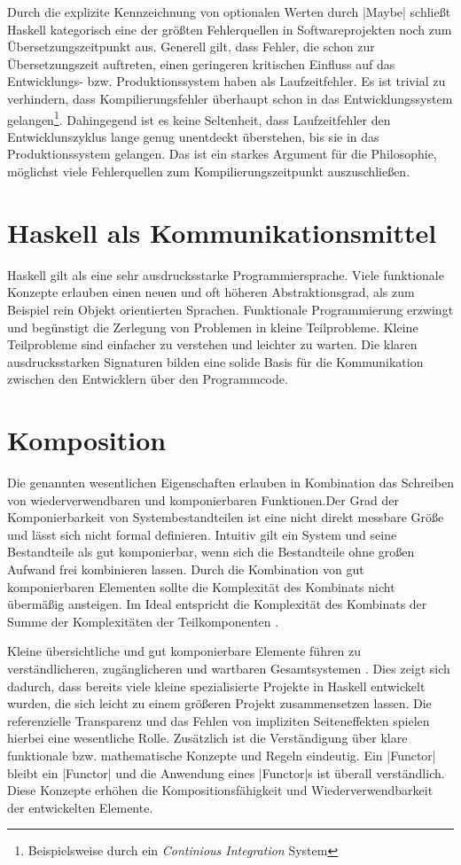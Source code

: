 Durch die explizite Kennzeichnung von optionalen Werten durch |Maybe| schließt Haskell kategorisch eine der größten Fehlerquellen in Softwareprojekten noch zum Übersetzungszeitpunkt aus. Generell gilt, dass Fehler, die schon zur Übersetzungszeit auftreten, einen geringeren kritischen Einfluss auf das Entwicklungs- bzw. Produktionssystem haben als Laufzeitfehler. Es ist trivial zu verhindern, dass Kompilierungsfehler überhaupt schon in das Entwicklungssystem gelangen\footnote{Beispielsweise durch ein \textit{Continious Integration} System}. Dahingegend ist es keine Seltenheit, dass Laufzeitfehler den Entwicklunszyklus lange genug unentdeckt überstehen, bis sie in das Produktionssystem gelangen. Das ist ein starkes Argument für die Philosophie, möglichst viele Fehlerquellen zum Kompilierungszeitpunkt auszuschließen.

\section{Haskell als Kommunikationsmittel}

Haskell gilt als eine sehr ausdrucksstarke Programmiersprache. Viele funktionale Konzepte erlauben einen neuen und oft höheren Abstraktionsgrad, als zum Beispiel rein Objekt orientierten Sprachen. Funktionale Programmierung erzwingt und begünstigt die Zerlegung von Problemen in kleine Teilprobleme. Kleine Teilprobleme sind einfacher zu verstehen und leichter zu warten. Die klaren ausdrucksstarken Signaturen bilden eine solide Basis für die Kommunikation zwischen den Entwicklern über den Programmcode. 

\section{Komposition}

Die genannten wesentlichen Eigenschaften erlauben in Kombination das Schreiben von wiederverwendbaren und komponierbaren Funktionen.Der Grad der Komponierbarkeit von Systembestandteilen ist eine nicht direkt messbare Größe und lässt sich nicht formal definieren. Intuitiv gilt ein System und seine Bestandteile als gut komponierbar, wenn sich die Bestandteile ohne großen Aufwand frei kombinieren lassen. Durch die Kombination von gut komponierbaren Elementen sollte die Komplexität des Kombinats nicht übermäßig ansteigen. Im Ideal entspricht die Komplexität des Kombinats der Summe der Komplexitäten der Teilkomponenten \parencite[Seite 19]{Blackheath2013}.

Kleine übersichtliche und gut komponierbare Elemente führen zu verständlicheren, zugänglicheren und wartbaren Gesamtsystemen \parencite[Seite 12 ff.]{Stewart2015}. Dies zeigt sich dadurch, dass bereits viele kleine spezialisierte Projekte in Haskell entwickelt wurden, die sich leicht zu einem größeren Projekt zusammensetzen lassen. Die referenzielle Transparenz und das Fehlen von impliziten Seiteneffekten spielen hierbei eine wesentliche Rolle. Zusätzlich ist die Verständigung über klare funktionale bzw. mathematische Konzepte und Regeln eindeutig. Ein |Functor| bleibt ein |Functor| und die Anwendung eines |Functor|s ist überall verständlich. Diese Konzepte erhöhen die Kompositionsfähigkeit und Wiederverwendbarkeit der entwickelten Elemente.

